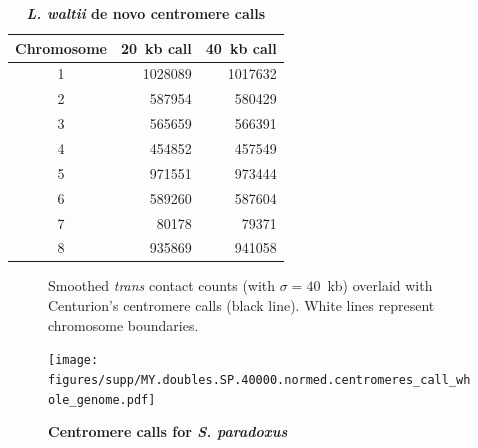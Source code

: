 \begin{table}[ht!]
\caption{\textbf{\textit{L. waltii} de novo centromere calls}}
\begin{center}
\begin{tabular}{c | r r}
\textbf{Chromosome} & \textbf{20~kb call} & \textbf{40~kb call} \\
\hline
1 & \num[group-separator={\,}]{1028089} & \num[group-separator={\,}]{1017632} \\
2 & \num[group-separator={\,}]{587954} & \num[group-separator={\,}]{580429} \\
3 & \num[group-separator={\,}]{565659} & \num[group-separator={\,}]{566391} \\
4 & \num[group-separator={\,}]{454852} & \num[group-separator={\,}]{457549} \\
5 & \num[group-separator={\,}]{971551} & \num[group-separator={\,}]{973444} \\
6 & \num[group-separator={\,}]{589260} & \num[group-separator={\,}]{587604} \\
7 & \num[group-separator={\,}]{80178} & \num[group-separator={\,}]{79371} \\
8 & \num[group-separator={\,}]{935869} & \num[group-separator={\,}]{941058} \\
\end{tabular}
\end{center}
\end{table}

\clearpage


\begin{figure}[ht!]
\caption{\textbf{Centromere calls for \textit{S. paradoxus}}}{
Smoothed \textit{trans} contact counts (with $\sigma=40$~kb) overlaid with
Centurion's centromere calls (black line). White lines represent chromosome
boundaries.
}

\begin{center}
\texttt{[image: figures/supp/MY.doubles.SP.40000.normed.centromeres\_call\_whole\_genome.pdf]}
\end{center}
\label{suppfig:SP_calls}
\end{figure}


